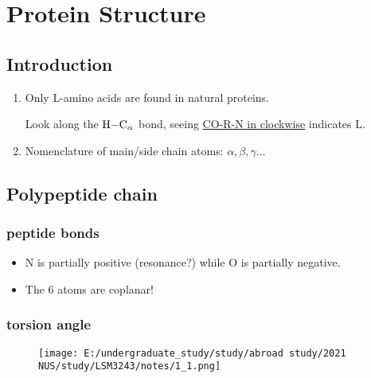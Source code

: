 \chapter{Protein Structure}

\begin{introduction}
	\item 
\end{introduction}

\hypertarget{introduction}{%
	\section{Introduction}\label{introduction}}

\begin{enumerate}
	\def\labelenumi{\arabic{enumi}.}
	\item
	Only L-amino acids are found in natural proteins.
	
	Look along the \(\ce{H-C_\alpha}\) bond, seeing \underline{CO-R-N in
		clockwise} indicates L.
	\item
	Nomenclature of main/side chain atoms: \(\alpha, \beta, \gamma\dots\)
\end{enumerate}

\hypertarget{polypeptide-chain}{%
	\section{Polypeptide chain}\label{polypeptide-chain}}

\hypertarget{peptide-bonds}{%
	\subsection{peptide bonds}\label{peptide-bonds}}

\begin{itemize}
	\item
	N is partially positive (resonance?) while O is partially negative.
	\item
	The 6 atoms are coplanar!
\end{itemize}

\hypertarget{torsion-angle}{%
	\subsection{torsion angle}\label{torsion-angle}}

\begin{figure}
	\centering
	\texttt{[image: E:/undergraduate\_study/study/abroad study/2021 NUS/study/LSM3243/notes/1\_1.png]}
\end{figure}

